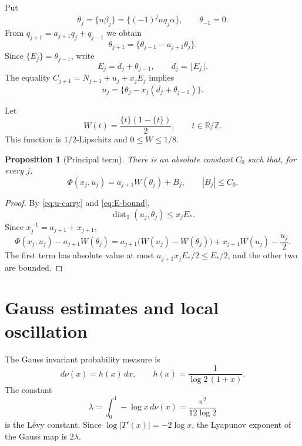 \documentclass[11pt,a4paper]{amsart}
\newtheorem{proposition}[theorem]{Proposition}
\theoremstyle{definition}
\theoremstyle{remark}
\newcommand{\T}{\mathbb T}
\newcommand{\Z}{\mathbb Z}
\newcommand{\R}{\mathbb R}
\newcommand{\dist}{\operatorname{dist}}
\begin{document}
Put
\begin{equation}\label{eq:theta}
 \theta_j=\{n\beta_j\}=\{(-1)^jnq_j\alpha\},
 \qquad \theta_{-1}=0.
\end{equation}
From $q_{j+1}=a_{j+1}q_j+q_{j-1}$ we obtain
\begin{equation}\label{eq:theta-cocycle}
 \theta_{j+1}=\{\theta_{j-1}-a_{j+1}\theta_j\}.
\end{equation}
Since $\{E_j\}=\theta_{j-1}$, write
\[
 E_j=d_j+\theta_{j-1},\qquad d_j=\lfloor E_j\rfloor.
\]
The equality $C_{j+1}=N_{j+1}+u_j+x_jE_j$ implies
\begin{equation}\label{eq:u-carry}
 u_j=\{\theta_j-x_j(d_j+\theta_{j-1})\}.
\end{equation}

Let
\[
 W(t)=\frac{\{t\}(1-\{t\})}{2},\qquad t\in\R/\Z.
\]
This function is $1/2$-Lipschitz and $0\le W\le1/8$.

\begin{proposition}[Principal term]\label{prop:principal}
There is an absolute constant $C_0$ such that, for every $j$,
\begin{equation}\label{eq:principal-split}
 \Phi(x_j,u_j)=a_{j+1}W(\theta_j)+B_j,
 \qquad |B_j|\le C_0.
\end{equation}
\end{proposition}

\begin{proof}
By \eqref{eq:u-carry} and \eqref{eq:E-bound},
\[
 \dist_{\T}(u_j,\theta_j)\le x_jE_*.
\]
Since $x_j^{-1}=a_{j+1}+x_{j+1}$,
\[
 \Phi(x_j,u_j)-a_{j+1}W(\theta_j)
 =a_{j+1}\bigl(W(u_j)-W(\theta_j)\bigr)
  +x_{j+1}W(u_j)-\frac{u_j}{2}.
\]
The first term has absolute value at most
$a_{j+1}x_jE_*/2\le E_*/2$, and the other two are bounded.
\end{proof}


\section{Gauss estimates and local oscillation}

The Gauss invariant probability measure is
\begin{equation}\label{eq:gauss-measure}
 d\nu(x)=h(x)\,dx,
 \qquad h(x)=\frac1{\log2\,(1+x)}.
\end{equation}
The constant
\begin{equation}\label{eq:lambda}
 \lambda=\int_0^1-\log x\,d\nu(x)
 =\frac{\pi^2}{12\log2}
\end{equation}
is the L\'evy constant.  Since $\log|T'(x)|=-2\log x$, the Lyapunov
exponent of the Gauss map is $2\lambda$.
\end{document}
